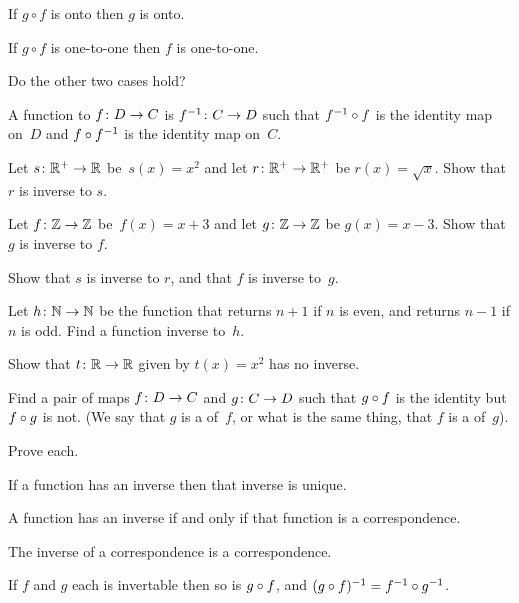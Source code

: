 \documentclass{ibl}
\begin{document}
\begin{ex} 
\begin{exes}
\item If $g\circ f$ is onto then $g$ is onto.
\item If $g\circ f$ is one-to-one then $f$ is one-to-one.
\item Do the other two cases hold?     
\end{exes}
\end{ex}

\begin{df}
A function  to $\mbox{$f\colon D\to C$}$ is 
$\mbox{$f^{-1}\colon C\to D$}$ such that 
$f^{-1}\mathbin{\circ} f$ is the identity map on~$D$ and
$f\mathbin{\circ} f^{-1}$ is the identity map on~$C$.
\end{df}

\begin{ex} 
\begin{exes}
\item Let $\mbox{$s\colon \mathbb{R}^+\to \mathbb{R}$}$ be~$s(x)=x^2$ and let
  $\mbox{$r\colon \mathbb{R}^+\to \mathbb{R}^+$}$ be $r(x)=\sqrt{x}$.
  Show that $r$ is inverse to $s$.    
\item Let $\mbox{$f\colon \mathbb{Z}\to \mathbb{Z}$}$ be~$f(x)=x+3$ and let
  $\mbox{$g\colon \mathbb{Z}\to \mathbb{Z}$}$ be $g(x)=x-3$.
  Show that $g$ is inverse to $f$.
\item Show that $s$ is inverse to $r$, and that $f$ is inverse to~$g$.
\item Let $\mbox{$h\colon \mathbb{N}\to \mathbb{N}$}$ be the function that returns
  $n+1$ if $n$ is even, and returns $n-1$ if $n$ is odd.
  Find a function inverse to~$h$.
\item Show that $\mbox{$t\colon \mathbb{R}\to \mathbb{R}$}$ given by $t(x)=x^2$
  has no inverse.
\end{exes}
\end{ex}

\begin{ex}
  Find a pair of maps $\mbox{$f\colon D\to C$}$ and $\mbox{$g\colon C\to D$}$
  such that $g\mathbin{\circ} f$ is the identity but $f\mathbin{\circ} g$
  is not.
  (We say that $g$ is a  of~$f$, or what is the
  same thing, that $f$ is a  of~$g$).
\end{ex}

\begin{ex} Prove each.
\begin{exes}
\item If a function has an inverse then that inverse
  is unique.
\item A function has an inverse if and only if that 
  function is a correspondence.
\item The inverse of a correspondence is a correspondence.  
\item If $f$ and $g$ each is invertable then so is 
  $g\mathbin{\circ} f$, and $(g\mathbin{\circ} f)^{-1}=f^{-1}\mathbin{\circ} g^{-1}$.
\end{exes}  
\end{ex}
\end{document}
